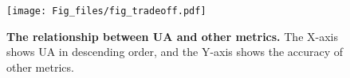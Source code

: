 \begin{figure}[h]
 \centering
  \texttt{[image: Fig\_files/fig\_tradeoff.pdf]}
  \caption{\textbf{The relationship between UA and other metrics.} The X-axis shows UA in descending order, and the Y-axis shows the accuracy of other metrics.}
  \label{fig:tradeoff}
\end{figure}




